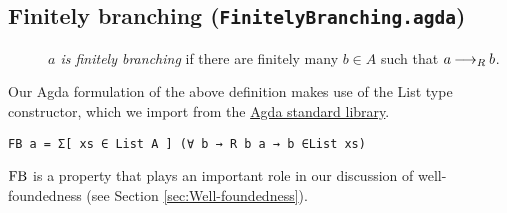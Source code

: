 \subsection{Finitely branching (\texttt{FinitelyBranching.agda})}

\begin{definition} \hfill
    \begin{description}
        \item[] \emph{$a$ is finitely branching} if there are finitely many $b \in A$ such that $a \mathbin{\longrightarrow_R} b$.
    \end{description}
\end{definition}

Our Agda formulation of the above definition makes use of the List type constructor, which we import from the \href{https://agda.github.io/agda-stdlib/v2.1/Agda.Builtin.List.html}{Agda standard library}.


\verb|FB a = Σ[ xs ∈ List A ] (∀ b → R b a → b ∈List xs)|

$\mathrm{FB}$ is a property that plays an important role in our discussion of well-foundedness (see Section \ref{sec:Well-foundedness}).


